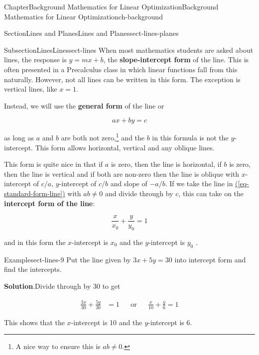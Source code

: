 \documentclass[oneside,10pt,]{book}
\newcommand{\blocktitlefont}{\relax}
\newcommand{\xreffont}{\relax}
\newcommand{\terminology}[1]{\textbf{#1}}
\numberwithin{equation}{section}
\newcommand{\amp}{&}
\begin{document}
\begin{chapterptx}{Chapter}{Background Mathematics for Linear Optimization}{}{Background Mathematics for Linear Optimization}{}{}{ch-background}
\begin{sectionptx}{Section}{Lines and Planes}{}{Lines and Planes}{}{}{sect-lines-planes}
%
\begin{subsectionptx}{Subsection}{Lines}{}{Lines}{}{}{sect-lines}
When most mathematics students are asked about lines, the response is \(y=mx+b\), the \terminology{slope-intercept form} of the line. This is often presented in a Precalculus class in which linear functions fall from this naturally. However, not all lines can be written in this form. The exception is vertical lines, like \(x=1\).%
\par
Instead, we will use the \terminology{general form} of the line or%
\par
%
\begin{equation}
ax + by = c\label{eq-standard-form-line}
\end{equation}
%
\par
as long as \(a\) and \(b\) are both not zero,\footnote{A nice way to ensure this is \(ab \neq 0\).\label{sect-lines-5-3}} and the \(b\) in this formula is not the \(y\)-intercept. This form allows horizontal, vertical and any oblique lines.%
\par
This form is quite nice in that if \(a\) is zero, then the line is horizontal, if \(b\) is zero, then the line is vertical and if both are non-zero then the line is oblique with \(x\)-intercept of \(c/a\), \(y\)-intercept of \(c/b\) and slope of \(-a/b\). If we take the line in \hyperref[eq-standard-form-line]{({\xreffont\ref{eq-standard-form-line}})} with \(ab \neq 0\) and divide through by \(c\), this can take on the \terminology{intercept form of the line}:%
\par
%
\begin{equation}
\frac{x}{x_0} + \frac{y}{y_0} = 1\label{eq-intercept-form-line}
\end{equation}
%
\par
and in this form the \(x\)-intercept is \(x_0\) and the \(y\)-intercept is \(y_0\) .%
\begin{example}{Example}{}{sect-lines-9}%
Put the line given by \(3x+5y = 30\) into intercept form and find the intercepts.%
\par\smallskip%
\noindent\textbf{\blocktitlefont Solution}.\hypertarget{sect-lines-9-2}{}\quad{}Divide through by 30 to get%
\par
%
\begin{align*}
\frac{3x}{30} + \frac{5y}{30} \amp = 1 \amp\amp\text{or} \amp\amp \frac{x}{10} + \frac{y}{6} = 1
\end{align*}
%
\par
This shows that the \(x\)-intercept is 10 and the \(y\)-intercept is 6.%

\end{example}
\end{subsectionptx}
\end{sectionptx}
\end{chapterptx}
\end{document}
